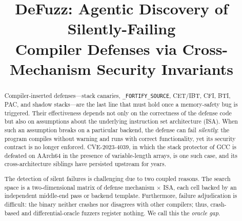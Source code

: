 \documentclass[conference]{IEEEtran}
\begin{document}
\title{DeFuzz: Agentic Discovery of Silently-Failing\\Compiler Defenses via Cross-Mechanism Security Invariants}

\author{
}

\maketitle
\thispagestyle{plain} %
\pagestyle{plain}     %

\begin{abstract}
Compiler-inserted defenses---stack canaries, \texttt{\_FORTIFY\_SOURCE},
CET/IBT, CFI, BTI, PAC, and shadow stacks---are the last line that must hold
once a memory-safety bug is triggered. Their effectiveness depends not only on
the correctness of the defense code but also on assumptions about the
underlying instruction set architecture (ISA). When such an assumption breaks
on a particular backend, the defense can fail \emph{silently}: the program
compiles without warning and runs with correct functionality, yet its security
contract is no longer enforced. CVE-2023-4039, in which the stack protector of GCC
is defeated on AArch64 in the presence of variable-length arrays, is one such
case, and its cross-architecture siblings have persisted upstream for years.

The detection of silent failures is challenging due to two coupled reasons. The search space is
a two-dimensional matrix of defense mechanism $\times$ ISA, each cell backed by
an independent middle-end pass or backend template. Furthermore, failure
adjudication is difficult: the binary neither crashes nor disagrees with other
compilers; thus, crash-based and differential-oracle fuzzers register nothing. We
call this the \emph{oracle gap}.


\end{abstract}
\end{document}
